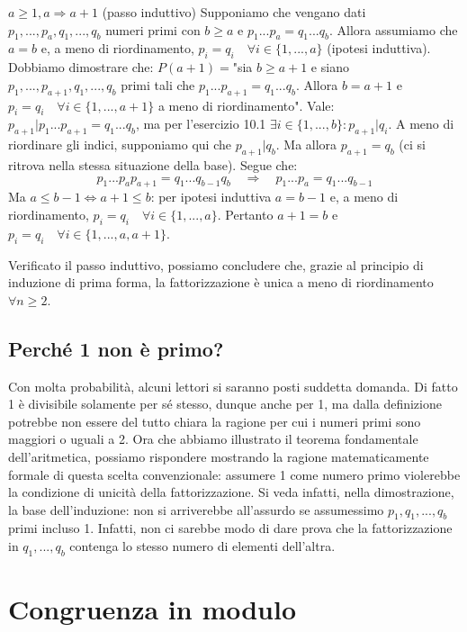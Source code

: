 \documentclass[oneside]{book}
\begin{document}
\begin{tcolorbox}[enhanced, breakable, title={Teorema Fondamentale dell'Aritmetica}]
$a \geq 1, a \Rightarrow a+1$ (passo induttivo) Supponiamo che vengano dati $p_1,...,p_a,
q_1,...,q_b$ numeri primi con $b \geq a$ e $p_1...p_a = q_1...q_b$. Allora
assumiamo che $a=b$ e, a meno di riordinamento, $p_i = q_i \quad \forall i \in \{1,...,a\}$
(ipotesi induttiva). Dobbiamo dimostrare che: $P(a+1)= $"sia $b \geq a+1$ e siano
$p_1,...,p_{a+1},q_1,...,q_b$ primi tali che $p_1...p_{a+1} = q_1...q_b$.
Allora $b = a+1$ e $p_i = q_i \quad \forall i \in \{1,...,a+1\}$
a meno di riordinamento". Vale: $p_{a+1}|p_1...p_{a+1} = q_1...q_b$, ma per
l'esercizio 10.1 $\exists i \in \{1,...,b\}: p_{a+1}|q_i$. A meno di riordinare
gli indici, supponiamo qui che $p_{a+1}|q_b$. Ma allora $p_{a+1} = q_b$ (ci si
ritrova nella stessa situazione della base). Segue che:
\[ p_1...p_ap_{a+1} = q_1...q_{b-1}q_b \quad \Rightarrow \quad  p_1...p_a = q_1...q_{b-1} \]
Ma $a \leq b-1 \Leftrightarrow a+1 \leq b$: per ipotesi induttiva $a = b-1$ e,
a meno di riordinamento, $p_i = q_i \quad \forall i \in \{1,...,a\}$. Pertanto
$a+1 = b$ e $p_i = q_i \quad \forall i \in \{1,...,a,a+1\}$.

Verificato il passo induttivo, possiamo concludere che, grazie al principio di
induzione di prima forma, la fattorizzazione è unica a meno di riordinamento
$\forall n \geq 2$.
\cvd
\end{tcolorbox}

\subsection*{Perché 1 non è primo?}
Con molta probabilità, alcuni lettori si saranno posti suddetta domanda. Di fatto
1 è divisibile solamente per sé stesso, dunque anche per 1, ma dalla definizione
potrebbe non essere del tutto chiara la ragione per cui i numeri primi
sono maggiori o uguali a 2. Ora che abbiamo illustrato il teorema fondamentale
dell'aritmetica, possiamo rispondere mostrando la ragione matematicamente
formale di questa scelta convenzionale: assumere 1 come numero primo violerebbe
la condizione di unicità della fattorizzazione. Si veda infatti, nella dimostrazione,
la base dell'induzione: non si arriverebbe
all'assurdo se assumessimo $p_1,q_1,...,q_b$ primi incluso 1. Infatti, non ci
sarebbe modo di dare prova che la fattorizzazione in $q_1,...,q_b$ contenga lo
stesso numero di elementi dell'altra.




\section{Congruenza in modulo}
\end{document}
